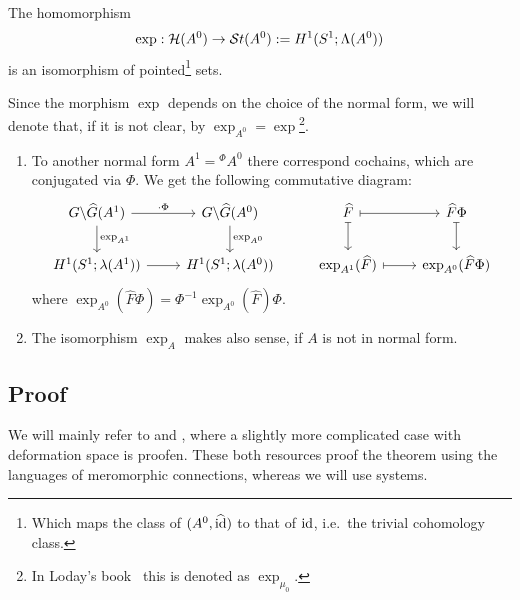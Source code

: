 \begin{tthm} \label{thm:mainThm1}
  The homomorphism
  \[
    \exp:\mathcal{H}(A^0)\to\mathcal{S}{}t(A^0):=H^1(S^1;\Lambda(A^0))
  \]
  is an isomorphism of pointed\footnote{Which maps the class of
  $(A^0,\widehat{\operatorname{id}})$ to that of $\operatorname{id}$, i.e.\ the trivial cohomology class.} sets.
\end{tthm}
Since the morphism $\exp$ depends on the choice of the normal form, we will
denote that, if it is not clear, by
$\exp_{A^0}=\exp$\footnote{In Loday's book~\cite{Loday1994} this is denoted as
$\exp_{\mu_0}$.}.
\begin{rem}\label{rem:expNonNormalForm}
  \begin{enumerate}
    \item {}
      To another normal form $A^1={}^\Phi\!A^0$ there correspond cochains,
      which are conjugated via $\Phi$.
      We get the following commutative diagram:
      \[ \begin{tikzcd}
          G\backslash\hat G(A^1) \rar{\cdot\Phi}\dar{\exp_{A^1}}
          & G\backslash\hat G(A^0) \dar{\exp_{A^0}}
          & \hat F \arrow[|->]{r}\arrow[|->]{d}
          & \hat F\Phi \arrow[|->]{d}
        \\ H^1(S^1;\lambda(A^1)) \rar
          & H^1(S^1;\lambda(A^0))
          & \exp_{A^1}(\hat F) \arrow[|->]{r}
          & \exp_{A^0}(\hat F\Phi)
      \end{tikzcd} \]
      where $\exp_{A^0}(\hat F\Phi)=\Phi^{-1}\exp_{A^0}(\hat F)\Phi$.
      \TODO[$\Phi\in G(\!(t)\!)$???]
    \item {}
      The isomorphism $\exp_A$ makes also sense, if $A$ is not in normal form.
  \end{enumerate}
\end{rem}

\subsection{Proof}
We will mainly refer to \cite[Proof of Theorem 4.5.1]{babbitt1989local} and
\cite[Section 6.d]{sabbah2007isomonodromic}, where a slightly more complicated
case with deformation space is proofen. These both resources proof the theorem
using the languages of meromorphic connections, whereas we will use systems.
\begin{comment}
  Our proof is obtained by choosing $X=\{0\}$ as the trivial deformation space
  and by translating to systems.
\end{comment}

